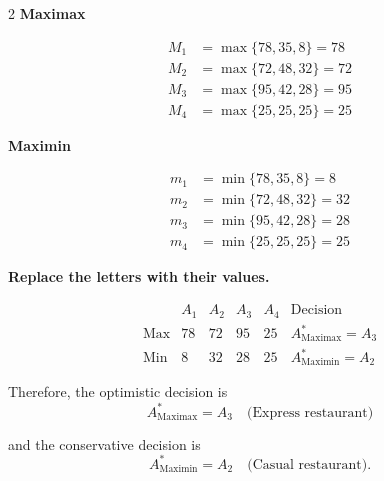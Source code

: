 {\begin{multicols}{2}
			\textbf{Maximax}
			
			\[
			\begin{array}{ll}
				M_1 &= \max\{78,35,8\}=78\\
				M_2 &= \max\{72,48,32\}=72\\
				M_3 &= \max\{95,42,28\}=95\\
				M_4 &= \max\{25,25,25\}=25
			\end{array}
			\]
			
			\textbf{Maximin}
			
			\[
			\begin{array}{ll}
				m_1 &= \min\{78,35,8\}=8\\
				m_2 &= \min\{72,48,32\}=32\\
				m_3 &= \min\{95,42,28\}=28\\
				m_4 &= \min\{25,25,25\}=25
			\end{array}
			\]
			
			\columnbreak
			
			\textbf{Replace the letters with their values.}
			
			\[
			\begin{array}{c|ccccc}
				& A_1 & A_2 & A_3 & A_4 & \text{Decision}\\
				\hline
				\text{Max} &
				78 & 72 & 95 & 25 &
				A^*_{\mathrm{Maximax}}=A_3
				\\
				\text{Min} &
				8 & 32 & 28 & 25 &
				A^*_{\mathrm{Maximin}}=A_2
			\end{array}
			\]
			
			Therefore, the optimistic decision is
			\[
			A^*_{\mathrm{Maximax}}=A_3
			\quad\text{(Express restaurant)}
			\]
			
			and the conservative decision is
			\[
			A^*_{\mathrm{Maximin}}=A_2
			\quad\text{(Casual restaurant)}.
			\]
			
		\end{multicols}
		
	}
	
